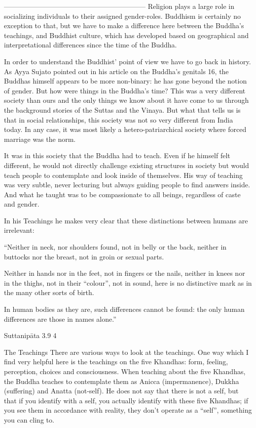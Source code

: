 --------------------------------------------------------------
Religion plays a large role in socializing individuals to their assigned gender-roles. Buddhism is certainly no exception to that, but we have to make a difference here between the Buddha’s teachings, and Buddhist culture, which has developed based on geographical and interpretational differences since the time of the Buddha.

In order to understand the Buddhist’ point of view we have to go back in history. As Ayya Sujato pointed out in his article on the Buddha’s genitals 16, the Buddhas himself appears to be more non-binary: he has gone beyond the notion of gender. But how were things in the Buddha’s time? This was a very different society than ours and the only things we know about it have come to us through the background stories of the Suttas and the Vinaya. But what that tells us is that in social relationships, this society was not so very different from India today. In any case, it was most likely a hetero-patriarchical society where forced marriage was the norm.

It was in this society that the Buddha had to teach. Even if he himself felt different, he would not directly challenge existing structures in society but would teach people to contemplate and look inside of themselves. His way of teaching was very subtle, never lecturing but always guiding people to find answers inside. And what he taught was to be compassionate to all beings, regardless of caste and gender.

In his Teachings he makes very clear that these distinctions between humans are irrelevant:

“Neither in neck, nor shoulders found,
not in belly or the back,
neither in buttocks nor the breast,
not in groin or sexual parts.

Neither in hands nor in the feet,
not in fingers or the nails,
neither in knees nor in the thighs,
not in their “colour”, not in sound,
here is no distinctive mark
as in the many other sorts of birth.

In human bodies as they are,
such differences cannot be found:
the only human differences
are those in names alone.”

Suttanipāta 3.9 4

The Teachings
There are various ways to look at the teachings. One way which I find very helpful here is the teachings on the five Khandhas: form, feeling, perception, choices and consciousness. When teaching about the five Khandhas, the Buddha teaches to contemplate them as Anicca (impermanence), Dukkha (suffering) and Anatta (not-self). He does not say that there is not a self, but that if you identify with a self, you actually identify with these five Khandhas; if you see them in accordance with reality, they don’t operate as a “self”, something you can cling to.

